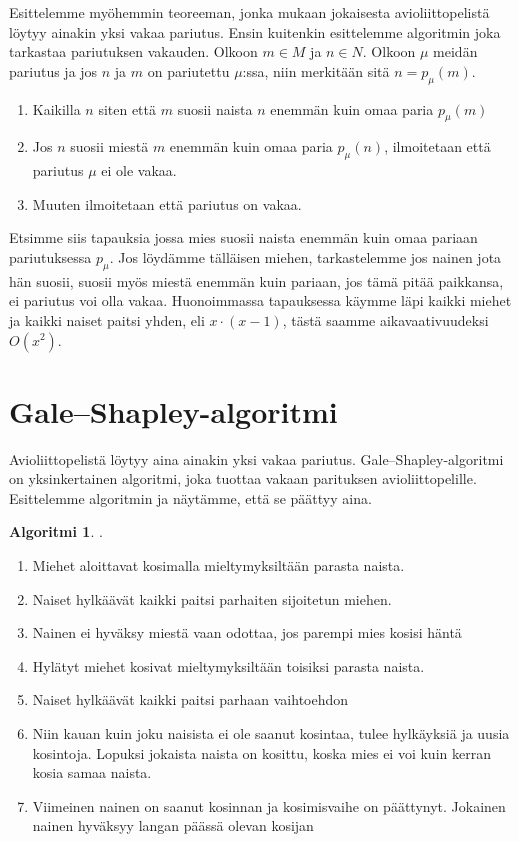 \documentclass[finnish]{tktltiki2}
\theoremstyle{definition}
\newtheorem{alg}[lau]{Algoritmi}
\theoremstyle{remark}
\begin{document}
Esittelemme myöhemmin teoreeman, jonka mukaan jokaisesta avioliittopelistä löytyy ainakin yksi vakaa pariutus. Ensin kuitenkin esittelemme algoritmin joka tarkastaa pariutuksen vakauden.
Olkoon $m \in M$ ja $n \in N$. Olkoon $\mu$ meidän pariutus ja jos $n$ ja $m$ on pariutettu $\mu$:ssa, niin merkitään sitä $n = p_\mu(m)$.
\begin{enumerate}
	\item Kaikilla $n$ siten että $m$ suosii naista $n$ enemmän kuin omaa paria $p_{\mu}(m)$
	\item Jos $n$ suosii miestä $m$ enemmän kuin omaa paria $p_{\mu}(n)$, ilmoitetaan että pariutus $\mu$ ei ole vakaa.
	\item Muuten ilmoitetaan että pariutus on vakaa.
\end{enumerate}

Etsimme siis tapauksia jossa mies suosii naista enemmän kuin omaa pariaan pariutuksessa $p_\mu$.
Jos löydämme tälläisen miehen, tarkastelemme jos nainen jota hän suosii, suosii myös miestä enemmän kuin pariaan, jos tämä pitää paikkansa, ei pariutus voi olla vakaa.
Huonoimmassa tapauksessa käymme läpi kaikki miehet ja kaikki naiset paitsi yhden, eli $x\cdot(x-1)$, tästä saamme aikavaativuudeksi $O(x^2)$.

\section{Gale--Shapley-algoritmi}
Avioliittopelistä löytyy aina ainakin yksi vakaa pariutus. Gale--Shapley-algoritmi on yksinkertainen algoritmi, joka tuottaa vakaan parituksen avioliittopelille. Esittelemme algoritmin ja näytämme, että se päättyy aina.
\begin{alg} \cite[p. 13]{gale62a}.
\begin{enumerate}
	\item Miehet aloittavat kosimalla mieltymyksiltään parasta naista.
	\item Naiset hylkäävät kaikki paitsi parhaiten sijoitetun miehen.
	\item Nainen ei hyväksy miestä vaan odottaa, jos parempi mies kosisi häntä
	\item Hylätyt miehet kosivat mieltymyksiltään toisiksi parasta naista.
	\item Naiset hylkäävät kaikki paitsi parhaan vaihtoehdon
	\item Niin kauan kuin joku naisista ei ole saanut kosintaa, tulee hylkäyksiä ja uusia kosintoja. Lopuksi jokaista naista on kosittu, koska mies ei voi kuin kerran kosia samaa naista.
	\item Viimeinen nainen on saanut kosinnan ja kosimisvaihe on päättynyt. Jokainen nainen hyväksyy langan päässä olevan kosijan
\end{enumerate}
\end{alg}
\end{document}
